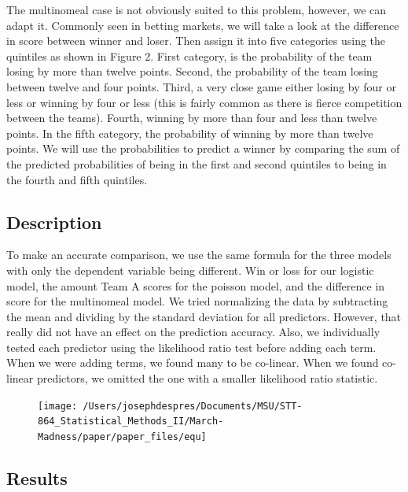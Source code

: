 \documentclass[
  man,floatsintext]{apa6}
\begin{document}
The multinomeal case is not obviously suited to this problem, however, we can adapt it. Commonly seen in betting markets, we will take a look at the difference in score between winner and loser. Then assign it into five categories using the quintiles as shown in Figure 2. First category, is the probability of the team losing by more than twelve points. Second, the probability of the team losing between twelve and four points. Third, a very close game either losing by four or less or winning by four or less (this is fairly common as there is fierce competition between the teams). Fourth, winning by more than four and less than twelve points. In the fifth category, the probability of winning by more than twelve points. We will use the probabilities to predict a winner by comparing the sum of the predicted probabilities of being in the first and second quintiles to being in the fourth and fifth quintiles.

\hypertarget{description}{%
\subsection{Description}\label{description}}

To make an accurate comparison, we use the same formula for the three models with only the dependent variable being different. Win or loss for our logistic model, the amount Team A scores for the poisson model, and the difference in score for the multinomeal model. We tried normalizing the data by subtracting the mean and dividing by the standard deviation for all predictors. However, that really did not have an effect on the prediction accuracy. Also, we individually tested each predictor using the likelihood ratio test before adding each term. When we were adding terms, we found many to be co-linear. When we found co-linear predictors, we omitted the one with a smaller likelihood ratio statistic.

\begin{figure}
\texttt{[image: /Users/josephdespres/Documents/MSU/STT-864\_Statistical\_Methods\_II/March-Madness/paper/paper\_files/equ]} \end{figure}

\hypertarget{results}{%
\subsection{Results}\label{results}}
\end{document}
